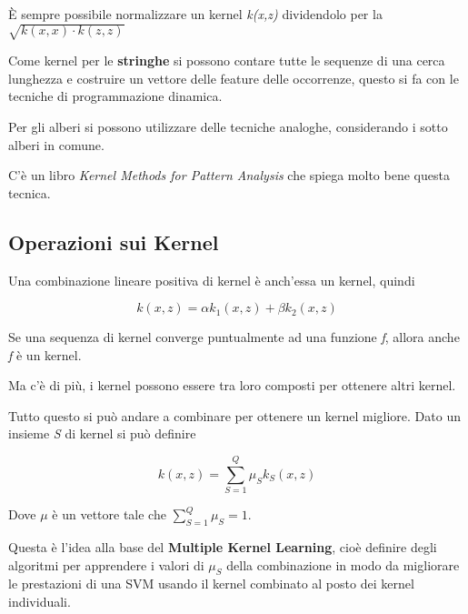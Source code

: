 È sempre possibile normalizzare un kernel \emph{k(x,z)} dividendolo per
la $\sqrt{k(x,x) \cdot k(z,z)}$

Come kernel per le \textbf{stringhe} si possono contare tutte le
sequenze di una cerca lunghezza e costruire un vettore delle feature
delle occorrenze, questo si fa con le tecniche di programmazione
dinamica.

Per gli alberi si possono utilizzare delle tecniche analoghe,
considerando i sotto alberi in comune.

C'è un libro \textit{Kernel Methods for Pattern Analysis} che spiega
molto bene questa tecnica.

\subsection{Operazioni sui Kernel}\label{operazioni-sui-kernel}

Una combinazione lineare positiva di kernel è anch'essa un kernel, quindi

$$
k(x,z) = \alpha k_1(x,z) + \beta k_2(x,z)
$$

Se una sequenza di kernel converge puntualmente ad una funzione
\emph{f}, allora anche \emph{f} è un kernel.

Ma c'è di più, i kernel possono essere tra loro composti per ottenere
altri kernel.

Tutto questo si può andare a combinare per ottenere un kernel migliore.
Dato un insieme \emph{S} di kernel si può definire

$$
k(x,z) = \sum\limits_{S=1}^Q \mu_S k_S(x,z)
$$

Dove $\mu$ è un vettore tale che $\sum\limits_{S=1}^Q \mu_S = 1$.

Questa è l'idea alla base del \textbf{Multiple Kernel Learning}, cioè definire degli algoritmi per
apprendere i valori di $\mu_S$ della combinazione in modo da migliorare le
prestazioni di una SVM usando il kernel combinato al posto dei kernel individuali.
